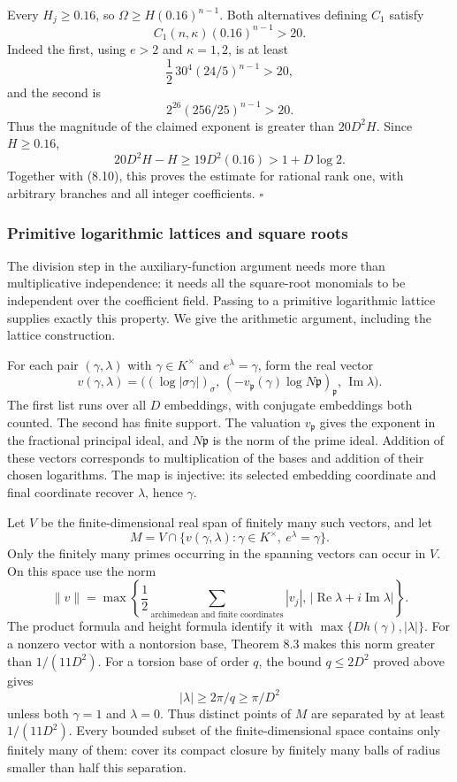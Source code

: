 \documentclass[
  11pt,
  a4paper,
]{article}
\begin{document}
Every \(H_j\ge0.16\), so \(\Omega\ge H(0.16)^{n-1}\). Both alternatives
defining \(C_1\) satisfy \[
C_1(n,\kappa)(0.16)^{n-1}>20.
\] Indeed the first, using \(e>2\) and \(\kappa=1,2\), is at least \[
\frac12\,30^4(24/5)^{n-1}>20,
\] and the second is \[
2^{26}(256/25)^{n-1}>20.
\] Thus the magnitude of the claimed exponent is greater than
\(20D^2H\). Since \(H\ge0.16\), \[
20D^2H-H\ge19D^2(0.16)>1+D\log2.
\] Together with (8.10), this proves the estimate for rational rank one,
with arbitrary branches and all integer coefficients. \(\square\)

\subsubsection{Primitive logarithmic lattices and square
roots}\label{primitive-logarithmic-lattices-and-square-roots}

The division step in the auxiliary-function argument needs more than
multiplicative independence: it needs all the square-root monomials to
be independent over the coefficient field. Passing to a primitive
logarithmic lattice supplies exactly this property. We give the
arithmetic argument, including the lattice construction.

For each pair \((\gamma,\lambda)\) with \(\gamma\in K^\times\) and
\(e^\lambda=\gamma\), form the real vector \[
v(\gamma,\lambda)=
\bigl((\log|\sigma\gamma|)_\sigma,\,
(-v_{\mathfrak p}(\gamma)\log N\mathfrak p)_{\mathfrak p},\,
\operatorname{Im}\lambda\bigr).
\tag{8.11}
\] The first list runs over all \(D\) embeddings, with conjugate
embeddings both counted. The second has finite support. The valuation
\(v_{\mathfrak p}\) gives the exponent in the fractional principal
ideal, and \(N\mathfrak p\) is the norm of the prime ideal. Addition of
these vectors corresponds to multiplication of the bases and addition of
their chosen logarithms. The map is injective: its selected embedding
coordinate and final coordinate recover \(\lambda\), hence \(\gamma\).

Let \(V\) be the finite-dimensional real span of finitely many such
vectors, and let \[
M=V\cap\{v(\gamma,\lambda):\gamma\in K^\times,\ e^\lambda=\gamma\}.
\] Only the finitely many primes occurring in the spanning vectors can
occur in \(V\). On this space use the norm \[
\|v\|=\max\left\{\frac12\sum_{\text{archimedean and finite coordinates}}|v_j|,
\,|\operatorname{Re}\lambda+i\operatorname{Im}\lambda|\right\}.
\] The product formula and height formula identify it with
\(\max\{D h(\gamma),|\lambda|\}\). For a nonzero vector with a
nontorsion base, Theorem 8.3 makes this norm greater than \(1/(11D^2)\).
For a torsion base of order \(q\), the bound \(q\le2D^2\) proved above
gives \[
|\lambda|\ge2\pi/q\ge\pi/D^2
\] unless both \(\gamma=1\) and \(\lambda=0\). Thus distinct points of
\(M\) are separated by at least \(1/(11D^2)\). Every bounded subset of
the finite-dimensional space contains only finitely many of them: cover
its compact closure by finitely many balls of radius smaller than half
this separation.
\end{document}
